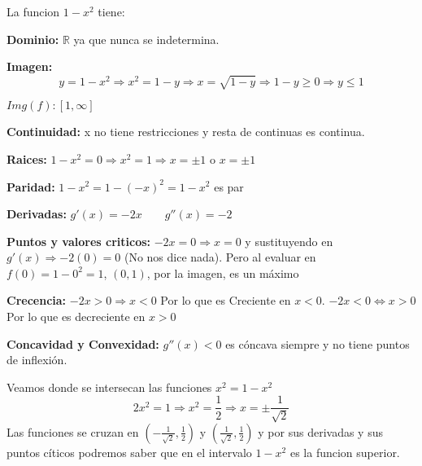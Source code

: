 \documentclass[12pt]{article}
\begin{document}
\begin{enumerate}[\hspace{9px} a)]
        La funcion \(1-x^2\) tiene: \medskip

        \textbf{Dominio: }\(\mathbb{R}\) ya que nunca se indetermina.\medskip

        \textbf{Imagen: }\medskip
        \begin{equation*}
            y=1-x^2 \Rightarrow x^2=1-y \Rightarrow x = \sqrt{1-y} \Rightarrow 1-y\geq0 \Rightarrow y\leq1
        \end{equation*}

        \(Img(f): [1,\infty]\)\medskip

        \textbf{Continuidad: } x no tiene restricciones y resta de continuas es continua.\medskip

        \textbf{Raices: }\(1-x^2=0\Rightarrow x^2=1\Rightarrow x=\pm1\) o \(x=\pm1\)\medskip

        \textbf{Paridad: }\(1-x^2 = 1-(-x)^2=1-x^2\) es par\medskip

        \textbf{Derivadas: }\(g'(x)=-2x \qquad g''(x)=-2\)\medskip

        \textbf{Puntos y valores criticos: }\(-2x=0\Rightarrow x=0\) y sustituyendo en \(g'(x)\Rightarrow -2(0)=0\) (No nos dice nada). Pero al evaluar en \(f(0)=1-0^2=1\), \((0,1)\), por la imagen, es un m\'aximo\medskip

        \textbf{Crecencia: }\(-2x>0\Rightarrow x<0\) Por lo que es Creciente en \(x<0\). \(-2x<0\Leftrightarrow x>0\) Por lo que es decreciente en \(x>0\)\medskip

        \textbf{Concavidad y Convexidad: } \(g''(x)<0\) es c\'oncava siempre y no tiene puntos de inflexi\'on.\medskip

        Veamos donde se intersecan las funciones \(x^2=1-x^2\) 
        \[2x^2=1\Rightarrow x^2=\displaystyle\frac{1}{2}\Rightarrow x=\pm\displaystyle\frac{1}{\sqrt{2}}\]
        Las funciones se cruzan en \(\left(-\frac{1}{\sqrt{2}},\displaystyle\frac{1}{2}\right)\) y \(\left(\frac{1}{\sqrt{2}},\displaystyle\frac{1}{2}\right)\) y por sus derivadas y sus puntos c\'iticos podremos saber que en el intervalo \(1-x^2\) es la funcion superior.\medskip


\end{enumerate}
\end{document}

